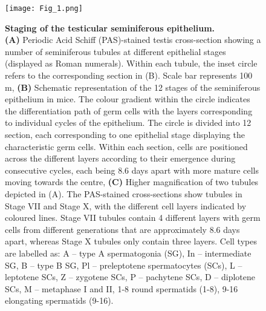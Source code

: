 \newpage

\begin{figure}[!h]
\centering
\texttt{[image: Fig\_1.png]}
\caption[Staging of the testicular seminiferous epithelium]{\textbf{Staging of the testicular seminiferous epithelium.}\\
\textbf{(A)} Periodic Acid Schiff (PAS)-stained testis cross-section showing a number of seminiferous tubules at different epithelial stages (displayed as Roman numerals). Within each tubule, the inset circle refers to the corresponding section in (B). Scale bar represents 100 \textmu{}m, \textbf{(B)} Schematic representation of the 12 stages of the seminiferous epithelium in mice. The colour gradient within the circle indicates the differentiation path of germ cells with the layers corresponding to individual cycles of the epithelium. The circle is divided into 12 section, each corresponding to one epithelial stage displaying the characteristic germ cells. Within each section, cells are positioned across the different layers according to their emergence during consecutive cycles, each being 8.6 days apart with more mature cells moving towards the centre, \textbf{(C)} Higher magnification of two tubules depicted in (A). The PAS-stained cross-sections show tubules in Stage VII and Stage X, with the different cell layers indicated by coloured lines. Stage VII tubules contain 4 different layers with germ cells from different generations that are approximately 8.6 days apart, whereas Stage X tubules only contain three layers. Cell types are labelled as: A – type A spermatogonia (SG), In – intermediate SG, B – type B SG, Pl – preleptotene spermatocytes (SCs), L – leptotene SCs, Z – zygotene SCs, P – pachytene SCs, D – diplotene SCs, M – metaphase I and II, 1-8 round spermatids (1-8), 9-16 elongating spermatids (9-16).}
\label{fig3:cell_staging}
\end{figure}

\newpage

